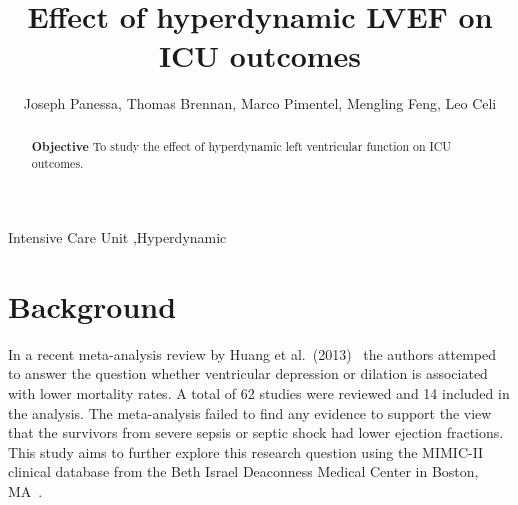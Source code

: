 \documentclass[final,10pt]{elsarticle}
\begin{document}

\begin{frontmatter}



\title{Effect of hyperdynamic LVEF on ICU outcomes}


\author{Joseph Panessa, Thomas Brennan, Marco Pimentel, Mengling Feng, Leo Celi}

\address{Cambridge MA, United States}


\begin{abstract}
\textbf{Objective}
 To study the effect of hyperdynamic left ventricular function on ICU outcomes.

\end{abstract}

\begin{keyword}
Intensive Care Unit \sep Hyperdynamic


\end{keyword}

\end{frontmatter}

\linenumbers

\section{Background}
\label{S:1}
In a recent meta-analysis review by Huang et al.~(2013)~\cite{huang2013early} the 
authors attemped to answer the question whether ventricular depression or dilation is 
associated with lower mortality rates. A total of 62 studies were reviewed and 14 
included in the analysis. The meta-analysis failed to find any evidence to support the 
view that the survivors from severe sepsis or septic shock had lower ejection fractions.
This study aims to further explore this research question using the MIMIC-II clinical 
database from the Beth Israel Deaconness Medical Center in Boston, MA~\cite{SaeedCCM11}.
 
\end{document}
